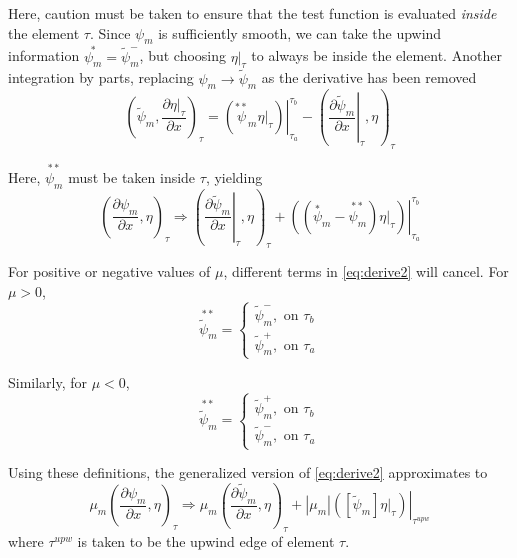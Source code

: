 \documentclass{article}
\newcommand{\pdiff}[2]{\frac{\partial#1}{\partial#2}}
\newcommand{\ddx}[1]{\pdiff{#1}{x}}
\newcommand{\dpmdx}{\ddx{\psi_m}}
\newcommand{\fepsi}{\tilde{\psi}}
\newcommand{\fepsim}{\fepsi_m}
\newcommand{\dfpmdx}{\ddx{\fepsim}}
\newcommand{\innerProd}[2]{\left(#1,#2\right)}
\newcommand{\tauInt}[2]{\innerProd{#1}{#2}_\tau}
\newcommand{\inTau}[1]{\left.#1\right\vert_{\tau}}
\newcommand{\fepsimp}{\fepsim^+}
\newcommand{\fepsimm}{\fepsim^-}
\newcommand{\mabs}[1]{\left|#1\right|}
\newcommand{\jump}[1]{\left[#1\right]}
\begin{document}
Here, caution must be taken to ensure that the test function is evaluated \textit{inside} the
element $\tau$.
Since $\psi_m$ is sufficiently smooth, we can take the upwind information $\overset{*}{\psi_m}=\fepsim^-$,
but choosing $\inTau{\eta}$ to always be inside the element.
Another integration by parts, replacing $\psi_m\rightarrow\fepsim$ as the derivative has been removed
\begin{equation}
    \label{eq:derive1}
    \tauInt{\fepsim}{\ddx{\inTau{\eta}}}=\left.\left(
        \overset{**}\psi_m\inTau{\eta}
    \right)\right|_{\tau_a}^{\tau_b}
    -\tauInt{\inTau{\ddx{\fepsim}}}{\eta}
\end{equation}

Here, $\overset{**}{\psi_m}$ must be taken inside $\tau$, yielding
\begin{equation}
    \label{eq:derive2}
    \tauInt{\dpmdx}{\eta}\Rightarrow
        \tauInt{\inTau{\ddx{\fepsim}}}{\eta}
        + \left.\left(\left(\overset{*}\psi_m-\overset{**}{\psi_m}\right)\inTau{\eta}\right)
        \right\vert_{\tau_a}^{\tau_b}
\end{equation}

For positive or negative values of $\mu$, different terms in \cref{eq:derive2} will cancel.
For $\mu>0$, 
\begin{equation}
    \overset{**}{\fepsim} = 
    \begin{cases}
        \fepsimm, \text{ on }\tau_b \\
        \fepsimp, \text{ on }\tau_a
    \end{cases}
\end{equation}

Similarly, for $\mu<0$,
\begin{equation}
    \overset{**}{\fepsim} = 
    \begin{cases}
        \fepsimp, \text{ on }\tau_b \\
        \fepsimm, \text{ on }\tau_a
    \end{cases}
\end{equation}

Using these definitions, the generalized version of \cref{eq:derive2} approximates to 
\begin{equation}
    \label{eq:derive3}
    \mu_m\tauInt{\dpmdx}{\eta}\Rightarrow\mu_m\tauInt{\dfpmdx}{\eta}
    + \mabs{\mu_m}\left.\left(\jump{\fepsim}\inTau{\eta}\right)\right|_{\tau^{upw}}
\end{equation}
where $\tau^{upw}$ is taken to be the upwind edge of element $\tau$.
\end{document}
